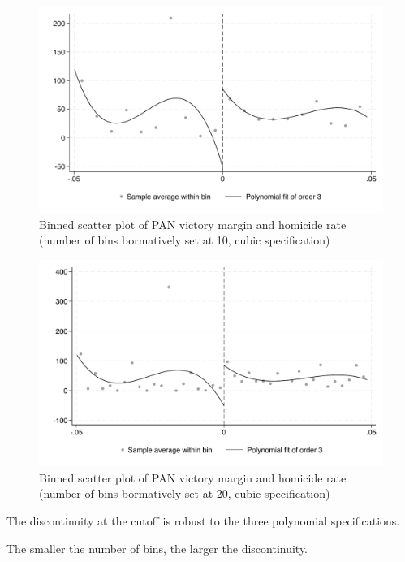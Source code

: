 \documentclass{article}
\begin{document}
\begin{figure}[H]
    \centering
    \includegraphics[scale=0.5]{../outputs/binned_scatter_10bins_cubic_plot.pdf}
    \caption{Binned scatter plot of PAN victory margin and homicide rate (number of bins bormatively set at 10, cubic specification)}
    \label{fig:binned_scatter_10bins_cubic}
\end{figure}

\begin{figure}[H]
    \centering
    \includegraphics[scale=0.5]{../outputs/binned_scatter_20bins_cubic_plot.pdf}
    \caption{Binned scatter plot of PAN victory margin and homicide rate (number of bins bormatively set at 20, cubic specification)}
    \label{fig:binned_scatter_20bins_cubic}
\end{figure}

The discontinuity at the cutoff is robust to the three polynomial specifications.

The smaller the number of bins, the larger the discontinuity.
\end{document}
